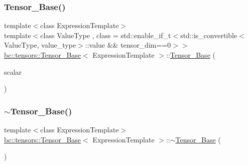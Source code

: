 \mbox{\label{classbc_1_1tensors_1_1Tensor__Base_a84dd106fa62c225311f8454aa80ffb94}} 
\subsubsection{\texorpdfstring{Tensor\+\_\+\+Base()}{Tensor\_Base()}\hspace{0.1cm}{\footnotesize\ttfamily [7/7]}}
{\footnotesize\ttfamily template$<$class Expression\+Template$>$ \\
template$<$class Value\+Type , class  = std\+::enable\+\_\+if\+\_\+t$<$std\+::is\+\_\+convertible$<$\+Value\+Type, value\+\_\+type$>$\+::value \&\& tensor\+\_\+dim==0$>$$>$ \\
\hyperlink{classbc_1_1tensors_1_1Tensor__Base}{bc\+::tensors\+::\+Tensor\+\_\+\+Base}$<$ Expression\+Template $>$\+::\hyperlink{classbc_1_1tensors_1_1Tensor__Base}{Tensor\+\_\+\+Base} (\begin{DoxyParamCaption}\item[{Value\+Type}]{scalar }\end{DoxyParamCaption})\hspace{0.3cm}{\ttfamily [inline]}}

\mbox{\label{classbc_1_1tensors_1_1Tensor__Base_a8954fa91e95472bd16bf4922df97f5d4}} 
\subsubsection{\texorpdfstring{$\sim$\+Tensor\+\_\+\+Base()}{~Tensor\_Base()}}
{\footnotesize\ttfamily template$<$class Expression\+Template$>$ \\
\hyperlink{classbc_1_1tensors_1_1Tensor__Base}{bc\+::tensors\+::\+Tensor\+\_\+\+Base}$<$ Expression\+Template $>$\+::$\sim$\hyperlink{classbc_1_1tensors_1_1Tensor__Base}{Tensor\+\_\+\+Base} (\begin{DoxyParamCaption}{ }\end{DoxyParamCaption})\hspace{0.3cm}{\ttfamily [inline]}}



